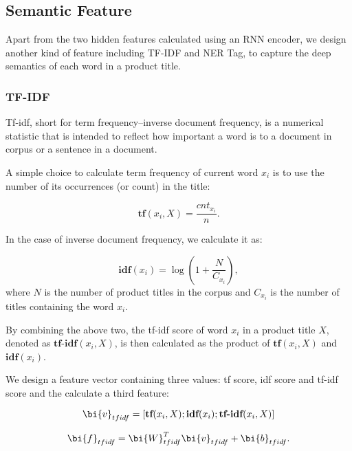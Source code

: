 \subsection{Semantic Feature}

Apart from the two hidden features calculated using an RNN encoder, 
we design another kind of feature including TF-IDF and NER Tag, 
to capture the deep semantics of each word in a product title.

\subsubsection{TF-IDF}

Tf-idf, short for term frequency–inverse document frequency, 
is a numerical statistic that is intended to reflect how important a word is to a document in corpus or a sentence in a document.

A simple choice to calculate term frequency of current word $x_i$ is to use the 
number of its occurrences (or count) in the title:

\begin{equation}
\label{eqn:tf}
\textbf{tf}(x_i, X) =\frac{cnt_{x_i}}{n}.
\end{equation}

In the case of inverse document frequency, we calculate it as:

\begin{equation}
\label{eqn:idf}
\textbf{idf}(x_i) =\log(1+\frac{N}{C_{x_i}}),
\end{equation}
where $N$ is the number of product titles in the corpus and $C_{x_i}$ is the number of titles containing the word $x_i$.

By combining the above two, the tf-idf score of word $x_i$ in a product title $X$, denoted as $\textbf{tf-idf}(x_i, X)$, is then calculated as the product of $\textbf{tf}(x_i, X)$ and $\textbf{idf}(x_i)$.

We design a feature vector containing three values: tf score, idf score and tf-idf score and the calculate a third feature:

\begin{equation}
\label{eqn:tf-idf}
\bi{v}_{tfidf} = [\textbf{tf}(x_i, X); \textbf{idf}(x_i); \textbf{tf-idf}(x_i, X)]
\end{equation}

\begin{equation}
\bi{f}_{tfidf} =\bi{W}_{tfidf}^T \bi{v}_{tfidf} + \bi{b}_{tfidf}.
\end{equation}


